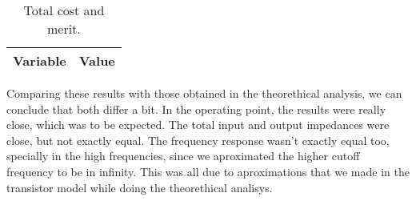 \begin{table}[H]
  \centering
  \begin{tabular}{|l|r|}
    \hline    
    {\bf Variable} & {\bf Value} \\ \hline
    
  \end{tabular}
  \caption{Total cost and merit.}
\end{table}

Comparing these results with those obtained in the theorethical analysis, we can conclude that both differ a bit. In the operating point, the results were really close, which was to be expected. The total input and output impedances were close, but not exactly equal. The frequency response wasn't exactly equal too, specially in the high frequencies, since we aproximated the higher cutoff frequency to be in infinity. This was all due to aproximations that we made in the transistor model while doing the theorethical analisys.





